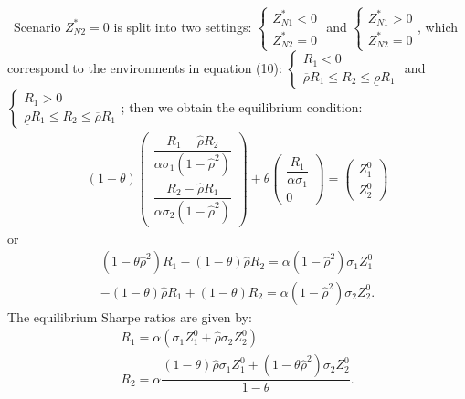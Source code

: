 \documentclass[10pt]{article}
\begin{document}
\quad \ 
Scenario $ Z_{N 2}^* = 0 $ is split into two settings: $ \left\{ \begin{matrix} Z_{N 1}^* < 0 \\ Z_{N 2}^* = 0 \end{matrix} \right. $ and $ \left\{ \begin{matrix} Z_{N 1}^* > 0 \\ Z_{N 2}^* = 0 \end{matrix} \right. $, which correspond to the environments in equation (10): $ \left\{ \begin{matrix} R_1 < 0 \\ \overline{\rho} R_1 \leqslant R_2 \leqslant \underline{\rho} R_1 \end{matrix} \right. $ and $ \left\{ \begin{matrix} R_1 > 0 \\ \underline{\rho} R_1 \leqslant R_2 \leqslant \overline{\rho} R_1 \end{matrix} \right. $; then we obtain the equilibrium condition:
\begin{eqnarray}
(1 - \theta) \left( \begin{matrix} \dfrac{R_1 - \hat \rho R_2}{\alpha \sigma_1 (1 - \hat \rho^2)} \\ \dfrac{R_2 - \hat \rho R_1}{\alpha \sigma_2 (1 - \hat \rho^2)} \end{matrix} \right) + \theta \left( \begin{matrix} \dfrac{R_1}{\alpha \sigma_1} \\ 0 \end{matrix} \right) = \left( \begin{matrix} Z_1^0 \\ Z_2^0 \end{matrix} \right)
\end{eqnarray}
or
\begin{eqnarray*}
& (1 - \theta {\hat \rho}^2) R_1 - (1 - \theta) {\hat \rho} R_2 = \alpha (1 - {\hat \rho}^2) \sigma_1 Z_1^0 & \\
& - (1 - \theta) {\hat \rho} R_1 + (1 - \theta) R_2 = \alpha (1 - {\hat \rho}^2) \sigma_2 Z_2^0. &
\end{eqnarray*}
The equilibrium Sharpe ratios are given by:
\begin{eqnarray}
& R_1 = \alpha (\sigma_1 Z_1^0 + {\hat \rho} \sigma_2 Z_2^0) & \\
& R_2 = \alpha \dfrac{(1 - \theta) {\hat \rho} \sigma_1 Z_1^0 + (1 - \theta {\hat \rho}^2) \sigma_2 Z_2^0}{1 - \theta}. &
\end{eqnarray}
\end{document}
